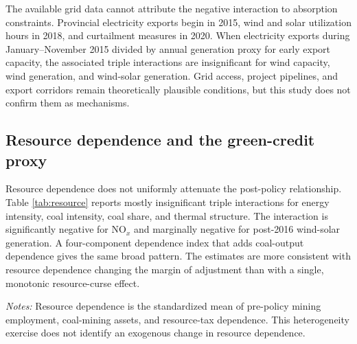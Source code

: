 \documentclass[11pt]{article}
\newcommand{\note}[1]{\begin{minipage}{0.96\textwidth}\footnotesize\textit{Notes:} #1\end{minipage}}
\begin{document}
The available grid data cannot attribute the negative interaction to absorption constraints. Provincial electricity exports begin in 2015, wind and solar utilization hours in 2018, and curtailment measures in 2020. When electricity exports during January--November 2015 divided by annual generation proxy for early export capacity, the associated triple interactions are insignificant for wind capacity, wind generation, and wind-solar generation. Grid access, project pipelines, and export corridors remain theoretically plausible conditions, but this study does not confirm them as mechanisms.

\subsection{Resource dependence and the green-credit proxy}

Resource dependence does not uniformly attenuate the post-policy relationship. Table \ref{tab:resource} reports mostly insignificant triple interactions for energy intensity, coal intensity, coal share, and thermal structure. The interaction is significantly negative for NO$_x$ and marginally negative for post-2016 wind-solar generation. A four-component dependence index that adds coal-output dependence gives the same broad pattern. The estimates are more consistent with resource dependence changing the margin of adjustment than with a single, monotonic resource-curse effect.

\begin{table}[H]
\centering
\caption{Exploratory triple interactions with resource dependence}
\label{tab:resource}
\note{Resource dependence is the standardized mean of pre-policy mining employment, coal-mining assets, and resource-tax dependence. This heterogeneity exercise does not identify an exogenous change in resource dependence.}
\end{table}
\end{document}
